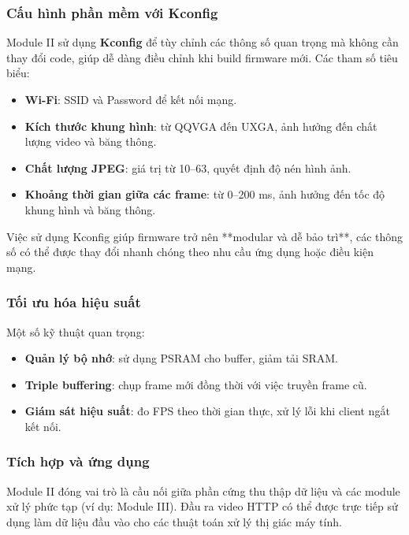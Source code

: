 \subsubsection{Cấu hình phần mềm với Kconfig}
Module II sử dụng \textbf{Kconfig} để tùy chỉnh các thông số quan trọng mà không cần thay đổi code, giúp dễ dàng điều chỉnh khi build firmware mới. Các tham số tiêu biểu:

\begin{itemize}
    \item \textbf{Wi-Fi}: SSID và Password để kết nối mạng.
    \item \textbf{Kích thước khung hình}: từ QQVGA đến UXGA, ảnh hưởng đến chất lượng video và băng thông.
    \item \textbf{Chất lượng JPEG}: giá trị từ 10–63, quyết định độ nén hình ảnh.
    \item \textbf{Khoảng thời gian giữa các frame}: từ 0–200 ms, ảnh hưởng đến tốc độ khung hình và băng thông.
\end{itemize}

Việc sử dụng Kconfig giúp firmware trở nên **modular và dễ bảo trì**, các thông số có thể được thay đổi nhanh chóng theo nhu cầu ứng dụng hoặc điều kiện mạng.

\subsubsection{Tối ưu hóa hiệu suất}
Một số kỹ thuật quan trọng:

\begin{itemize}
    \item \textbf{Quản lý bộ nhớ}: sử dụng PSRAM cho buffer, giảm tải SRAM.
    \item \textbf{Triple buffering}: chụp frame mới đồng thời với việc truyền frame cũ.
    \item \textbf{Giám sát hiệu suất}: đo FPS theo thời gian thực, xử lý lỗi khi client ngắt kết nối.
\end{itemize}

\subsubsection{Tích hợp và ứng dụng}
Module II đóng vai trò là cầu nối giữa phần cứng thu thập dữ liệu và các module xử lý phức tạp (ví dụ: Module III). Đầu ra video HTTP có thể được trực tiếp sử dụng làm dữ liệu đầu vào cho các thuật toán xử lý thị giác máy tính.


